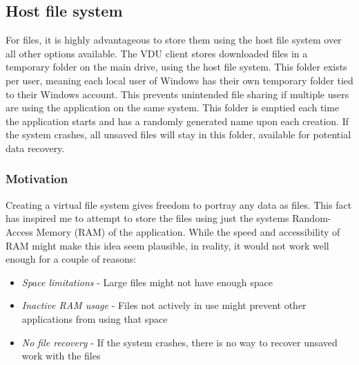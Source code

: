 \subsection{Host file system}
For files, it is highly advantageous to store them using the host file system over all other options available. The VDU client stores downloaded files in a temporary folder on the main drive, using the host file system. This folder exists per user, meaning each local user of Windows has their own temporary folder tied to their Windows account. This prevents unintended file sharing if multiple users are using the application on the same system. This folder is emptied each time the application starts and has a randomly generated name upon each creation. If the system crashes, all unsaved files will stay in this folder, available for potential data recovery. 

\subsubsection{Motivation}
Creating a virtual file system gives freedom to portray any data as files. This fact has inspired me to attempt to store the files using just the systems Random-Access Memory (RAM) of the application. While the speed and accessibility of RAM might make this idea seem plausible, in reality, it would not work well enough for a couple of reasons:
\begin{itemize}
    \item \textit{Space limitations} - Large files might not have enough space
    \item \textit{Inactive RAM usage} - Files not actively in use might prevent other applications from using that space
    \item \textit{No file recovery} - If the system crashes, there is no way to recover unsaved work with the files
\end{itemize}

